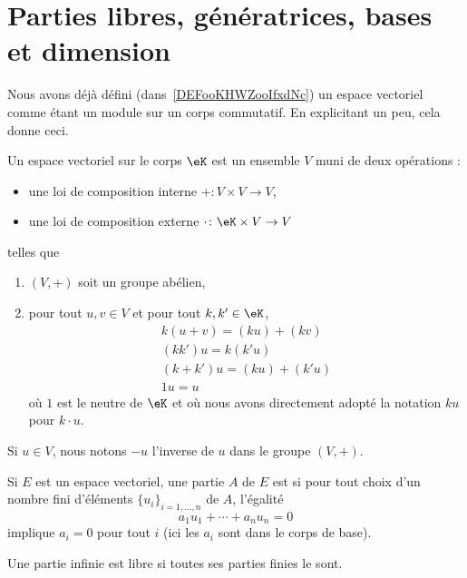 
\section{Parties libres, génératrices, bases et dimension}

Nous avons déjà défini (dans~\ref{DEFooKHWZooIfxdNc}) un espace vectoriel comme étant un module sur un corps commutatif. En explicitant un peu, cela donne ceci\cite{ooQLVLooEUrNLS}.

Un espace vectoriel sur le corps \( \eK\) est un ensemble \( V\) muni de deux opérations :
\begin{itemize}
	\item une loi de composition interne \( +\colon V\times V\to V\),
	\item une loi de composition externe \( \cdot\colon \eK\times V\to V\)
\end{itemize}
telles que
\begin{enumerate}
	\item
	      \( (V,+)\) soit un groupe abélien,
	\item
	      pour tout \( u,v\in V\) et pour tout \( k,k'\in \eK\),
	      \begin{subequations}
		      \begin{align}
			      k(u+v)=(ku)+(kv)   \\
			      (kk')u=k(k'u)      \\
			      (k+k')u=(ku)+(k'u) \\
			      1u=u
		      \end{align}
	      \end{subequations}
	      où \( 1\) est le neutre de \( \eK\) et où nous avons directement adopté la notation \( ku\) pour \( k\cdot u\).
\end{enumerate}
Si \( u\in V\), nous notons \( -u\) l'inverse de \( u\) dans le groupe \( (V,+)\).

\begin{definition}
	Si \( E\) est un espace vectoriel, une partie \( A\) de \( E\) est  si pour tout choix d'un nombre fini d'éléments \( \{ u_i \}_{i=1,\ldots, n}\) de \( A\), l'égalité
	\begin{equation}
		a_1 u_1+\cdots +a_nu_n=0
	\end{equation}
	implique \( a_i=0\) pour tout \( i\) (ici les \( a_i\) sont dans le corps de base).

	Une partie infinie est libre si toutes ses parties finies le sont.
\end{definition}

